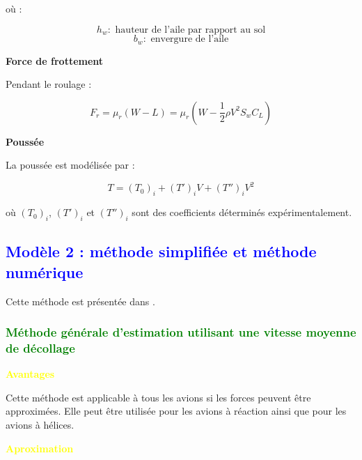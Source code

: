 	où :
	
	\[	h_w : \text{ hauteur de l’aile par rapport au sol}	\]	
	\[ b_w :	\text{ envergure de l’aile}	\]
	
	\vspace{0.5cm}
	
	\textbf{Force de frottement}
	
	Pendant le roulage :
	
	\begin{equation}
		F_r= \mu_r(W-L)	= \mu_r	\left( 	W-\frac{1}{2}\rho V^2 S_w C_L  \right)
	\end{equation}
	
	\vspace{0.5cm}
	
	\textbf{Poussée}
	
	La poussée est modélisée par :
	
	\begin{equation}
		T=(T_0)_i+(T')_iV+(T'')_iV^2
	\end{equation}
	
	où $(T_0)_i$, $(T')_i$ et $(T'')_i$ sont des coefficients déterminés expérimentalement.

	\subsection{\textcolor{blue} { Modèle 2 : méthode simplifiée et méthode numérique   }}
	Cette méthode est présentée dans \cite{smi:60}.
%
		\subsubsection{\textcolor{green} { Méthode générale d’estimation utilisant une vitesse moyenne de décollage } }
		
		\textbf{\textcolor{yellow}{Avantages}}
		
		Cette méthode est applicable à tous les avions si les forces peuvent être approximées. Elle peut être utilisée pour les avions à réaction ainsi que pour les avions à hélices.
		
		\vspace{0.3cm}
		
		\textbf{\textcolor{yellow}{Aproximation}}
		

